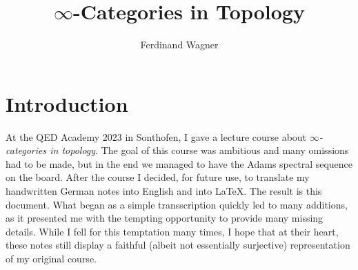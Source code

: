 \documentclass[DIV=12,numbers=enddot,leqno,bibliography=totoc]{scrartcl}
\title{$\infty$-Categories in Topology}
\author{Ferdinand Wagner}
\begin{document}
	\maketitle

	\tableofcontents
	\addtocounter{section}{-1}
	
	\newpage
	
	
	\renewcommand{\ParagraphOrNot}{\S}
	\section{Introduction}
	At the QED Academy 2023 in Sonthofen, I gave a lecture course about \emph{$\infty$-categories in topology}. The goal of this course was ambitious and many omissions had to be made, but in the end we managed to have the Adams spectral sequence on the board. After the course I decided, for future use, to translate my handwritten German notes into English and into \LaTeX. The result is this document. What began as a simple transscription quickly led to many additions, as it presented me with the tempting opportunity to provide many missing details. While I fell for this temptation many times, I hope that at their heart, these notes still display a faithful (albeit not essentially surjective) representation of my original course.
	
\end{document}
